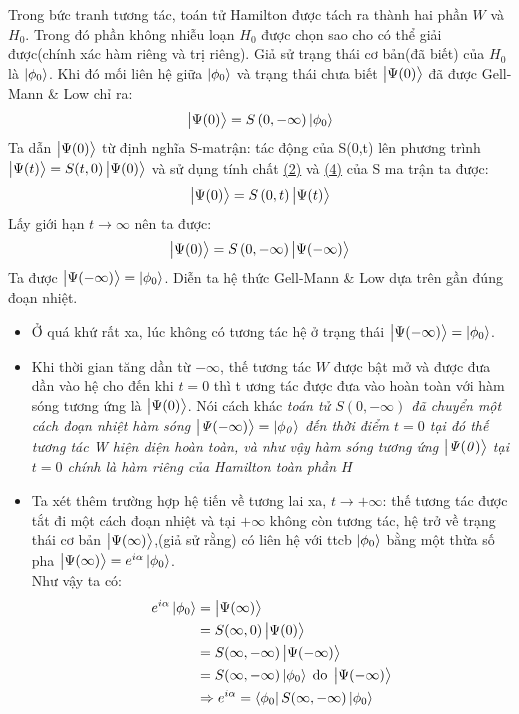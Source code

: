 \documentclass{report}
\begin{document}
\indent Trong bức tranh tương tác, toán tử Hamilton được tách ra thành hai phần $W$ và $H_0$. Trong đó phần không nhiễu loạn $H_0$ được chọn sao cho có thể giải được(chính xác hàm riêng và trị riêng). Giả sử trạng thái cơ bản(đã biết) của $H_{0}$ là $\ket{\phi_{0}}$. Khi đó mối liên hệ giữa $\ket{\phi_{0}}$ và trạng thái chưa biết $\ket{\Psi(0)}$ đã được Gell-Mann \& Low chỉ ra:
\begin{align}\label{eq1.27}
	\ket{\Psi(0)} = S\left(0,-\infty \right) \ket{\phi_{0}}
\end{align}
Ta dẫn $\ket{\Psi(0)}$ từ định nghĩa S-matrận: tác động của S(0,t) lên phương trình $\ket{\Psi(t)} = S(t,0)\ket{\Psi(0)}$ và sử dụng tính chất \hyperref[tc2]{(2)} và \hyperref[tc4]{(4)} của S ma trận ta được:
\begin{align}
	\ket{\Psi(0)} = S\left(0,t \right) \ket{\Psi(t)}\nonumber
\end{align}
Lấy giới hạn $t\rightarrow\infty$ nên ta được:
\begin{align}\label{eq1.28}
	\ket{\Psi(0)} = S\left(0,-\infty \right) \ket{\Psi(-\infty)}
\end{align}
Ta được $\ket{\Psi(-\infty)} = \ket{\phi_{0}}$. Diễn ta hệ thức Gell-Mann \& Low dựa trên gần đúng đoạn nhiệt.
\begin{itemize}
	\item Ở quá khứ rất xa, lúc không có tương tác hệ ở trạng thái $\ket{\Psi(-\infty)} = \ket{\phi_{0}}$.
	\item Khi thời gian tăng dần từ $-\infty$, thế tương tác $W$ được bật mở và được đưa dần vào hệ cho đến khi $t=0$ thì t ương tác được đưa vào hoàn toàn với hàm sóng tương ứng là $\ket{\Psi(0)}$. Nói cách khác \textit{toán tử $S(0,-\infty)$ đã chuyển một cách đoạn nhiệt hàm sóng $\mathit{\ket{\Psi(-\infty)} = \ket{\phi_{0}}}$ đến thời điểm $\mathit{t=0}$ tại đó thế tương tác W hiện diện hoàn toàn, và như vậy hàm sóng tương ứng $\mathit{\ket{\Psi(0)}}$ tại $\mathit{t=0}$ chính là hàm riêng của Hamilton toàn phần $\mathit{H}$}
	\item Ta xét thêm trường hợp hệ tiến về tương lai xa, $t\rightarrow+\infty$: thế tương tác được tắt đi một cách đoạn nhiệt và tại $+\infty$ không còn tương tác, hệ trở về trạng thái cơ bản $\ket{\Psi(\infty)}$,(giả sử rằng) có liên hệ với ttcb $\ket{\phi_0}$ bằng một thừa số pha $\ket{\Psi(\infty)} = e^{i\alpha}\ket{\phi_0}$.\\
	      Như vậy ta có:
	      \begin{align}
		      e^{i\alpha}\ket{\phi_0}
		       & = \ket{\Psi(\infty)}\nonumber                                                \\
		       & = S(\infty,0)\ket{\Psi(0)}\nonumber                                          \\
		       & = S(\infty,-\infty)\ket{\Psi(-\infty)}\nonumber                              \\
		       & = S(\infty,-\infty)\ket{\phi_0} \; \text{do} \; \ket{\Psi(-\infty)}\nonumber \\
		      \label{eq1.29}
		       & \Rightarrow e^{i\alpha} = \bra{\phi_{0}} S(\infty,-\infty) \ket{\phi_0}
	      \end{align}
\end{itemize}
\end{document}
